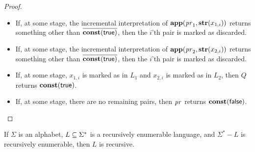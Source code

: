 \begin{proof}
\begin{itemize}
\item If, at some stage, the incremental interpretation of
  $\mathbf{app}(\mathit{pr}_1,\mathbf{str}(x_{1,i}))$ returns something other than
  $\overline{\mathbf{const}(\mathsf{true})}$, then the $i$'th pair is marked as
  discarded.

\item If, at some stage, the incremental interpretation of
  $\mathbf{app}(\mathit{pr}_2,\mathbf{str}(x_{2,i}))$ returns something other than
  $\overline{\mathbf{const}(\mathsf{true})}$, then the $i$'th pair is marked as
  discarded.

\item If, at some stage, $x_{1,i}$ is marked as in $L_1$ and $x_{2,i}$
  is marked as in $L_2$, then $Q$ returns $\mathbf{const}(\mathsf{true})$.

\item If, at some stage, there are no remaining pairs, then $\mathit{pr}$
  returns $\mathbf{const}(\mathsf{false})$.
\end{itemize}
\end{proof}

\begin{theorem}
If $\Sigma$ is an alphabet, $L\subseteq\Sigma^*$ is a recursively
enumerable language, and $\Sigma^*-L$ is recursively enumerable, then
$L$ is recursive.
\end{theorem}

